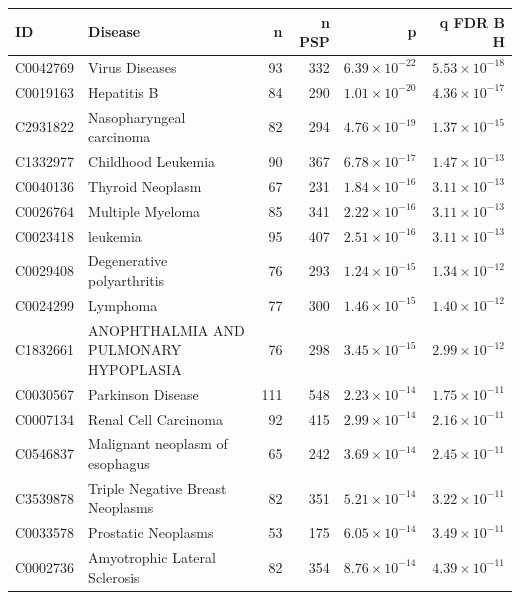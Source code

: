\begin{table}[ht]
\centering
\begin{adjustbox}{width=\textwidth}
\begin{tabular}{llrrrr}
  \hline
ID & Disease & n & n PSP & p & q FDR B H \\ 
  \hline
C0042769 & Virus Diseases & 93 & 332 & $6.39 \times 10^{-22}$ & $5.53 \times 10^{-18}$ \\ 
  C0019163 & Hepatitis B & 84 & 290 & $1.01 \times 10^{-20}$ & $4.36 \times 10^{-17}$ \\ 
  C2931822 & Nasopharyngeal carcinoma & 82 & 294 & $4.76 \times 10^{-19}$ & $1.37 \times 10^{-15}$ \\ 
  C1332977 & Childhood Leukemia & 90 & 367 & $6.78 \times 10^{-17}$ & $1.47 \times 10^{-13}$ \\ 
  C0040136 & Thyroid Neoplasm & 67 & 231 & $1.84 \times 10^{-16}$ & $3.11 \times 10^{-13}$ \\ 
  C0026764 & Multiple Myeloma & 85 & 341 & $2.22 \times 10^{-16}$ & $3.11 \times 10^{-13}$ \\ 
  C0023418 & leukemia & 95 & 407 & $2.51 \times 10^{-16}$ & $3.11 \times 10^{-13}$ \\ 
  C0029408 & Degenerative polyarthritis & 76 & 293 & $1.24 \times 10^{-15}$ & $1.34 \times 10^{-12}$ \\ 
  C0024299 & Lymphoma & 77 & 300 & $1.46 \times 10^{-15}$ & $1.40 \times 10^{-12}$ \\ 
  C1832661 & ANOPHTHALMIA AND PULMONARY HYPOPLASIA & 76 & 298 & $3.45 \times 10^{-15}$ & $2.99 \times 10^{-12}$ \\ 
  C0030567 & Parkinson Disease & 111 & 548 & $2.23 \times 10^{-14}$ & $1.75 \times 10^{-11}$ \\ 
  C0007134 & Renal Cell Carcinoma & 92 & 415 & $2.99 \times 10^{-14}$ & $2.16 \times 10^{-11}$ \\ 
  C0546837 & Malignant neoplasm of esophagus & 65 & 242 & $3.69 \times 10^{-14}$ & $2.45 \times 10^{-11}$ \\ 
  C3539878 & Triple Negative Breast Neoplasms & 82 & 351 & $5.21 \times 10^{-14}$ & $3.22 \times 10^{-11}$ \\ 
  C0033578 & Prostatic Neoplasms & 53 & 175 & $6.05 \times 10^{-14}$ & $3.49 \times 10^{-11}$ \\ 
  C0002736 & Amyotrophic Lateral Sclerosis & 82 & 354 & $8.76 \times 10^{-14}$ & $4.39 \times 10^{-11}$ \\ 

\end{tabular}
\end{adjustbox}
\end{table}
